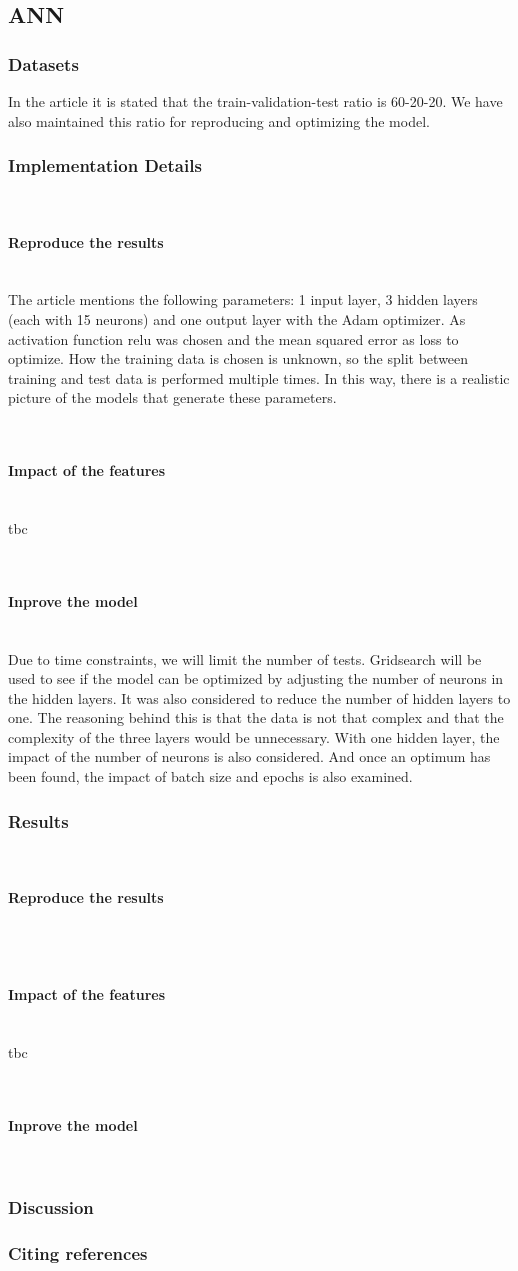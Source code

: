 \documentclass{article}
\newcommand{\subsubsubsection}[1]{%
  \paragraph{#1}\mbox{}\\}
\begin{document}
\subsection{ANN}

\subsubsection{Datasets}
In the article it is stated that the train-validation-test ratio is 60-20-20. We have also maintained this ratio for reproducing and optimizing the model.

\subsubsection{Implementation Details}

\subsubsubsection{Reproduce the results}
The article mentions the following parameters: 1 input layer, 3 hidden layers (each with 15 neurons) and one output layer with the Adam optimizer.
As activation function relu was chosen and the mean squared error as loss to optimize.
How the training data is chosen is unknown, so the split between training and test data is performed multiple times. In this way, there is a realistic picture of the models that generate these parameters.

\subsubsubsection{Impact of the features}
tbc

\subsubsubsection{Inprove the model}
Due to time constraints, we will limit the number of tests. Gridsearch will be used to see if the model can be optimized by adjusting the number of neurons in the hidden layers.
It was also considered to reduce the number of hidden layers to one. The reasoning behind this is that the data is not that complex and that the complexity of the three layers would be unnecessary. With one hidden layer, the impact of the number of neurons is also considered. And once an optimum has been found, the impact of batch size and epochs is also examined.

\subsubsection{Results}

\subsubsubsection{Reproduce the results}


\subsubsubsection{Impact of the features}
tbc

\subsubsubsection{Inprove the model}


\subsubsection{Discussion}




\subsubsection{Citing references}




\end{document}
